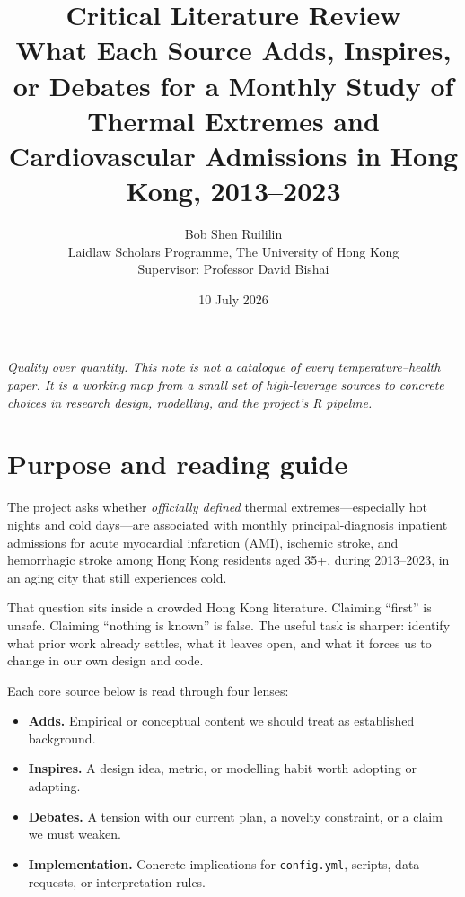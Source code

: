\documentclass[11pt]{article}
\title{
  \textbf{Critical Literature Review}\\[0.3em]
  \large What Each Source Adds, Inspires, or Debates for a Monthly Study of\\
  Thermal Extremes and Cardiovascular Admissions in Hong Kong, 2013--2023
}
\author{
  Bob Shen Ruililin\\
  Laidlaw Scholars Programme, The University of Hong Kong\\[0.4em]
  \small Supervisor: Professor David Bishai
}
\date{10 July 2026}
\newcommand{\adds}{\textcolor{green!40!black}{\textbf{Adds.}}}
\newcommand{\inspires}{\textcolor{blue!55!black}{\textbf{Inspires.}}}
\newcommand{\debates}{\textcolor{orange!70!black}{\textbf{Debates.}}}
\newcommand{\impl}{\textcolor{purple!55!black}{\textbf{Implementation.}}}
\begin{document}
\maketitle

\begin{center}
\small\textit{
Quality over quantity. This note is not a catalogue of every temperature--health paper.
It is a working map from a small set of high-leverage sources to concrete choices in
research design, modelling, and the project's R pipeline.
}
\end{center}

\tableofcontents
\vspace{0.8em}

\section{Purpose and reading guide}

The project asks whether \emph{officially defined} thermal extremes---especially hot
nights and cold days---are associated with monthly principal-diagnosis inpatient
admissions for acute myocardial infarction (AMI), ischemic stroke, and hemorrhagic
stroke among Hong Kong residents aged 35+, during 2013--2023, in an aging city that
still experiences cold.

That question sits inside a crowded Hong Kong literature. Claiming ``first'' is
unsafe. Claiming ``nothing is known'' is false. The useful task is sharper:
identify what prior work already settles, what it leaves open, and what it forces
us to change in our own design and code.

Each core source below is read through four lenses:

\begin{itemize}
  \item \adds{} Empirical or conceptual content we should treat as established
        background.
  \item \inspires{} A design idea, metric, or modelling habit worth adopting or
        adapting.
  \item \debates{} A tension with our current plan, a novelty constraint, or a
        claim we must weaken.
  \item \impl{} Concrete implications for \texttt{config.yml}, scripts, data
        requests, or interpretation rules.
\end{itemize}
\end{document}
